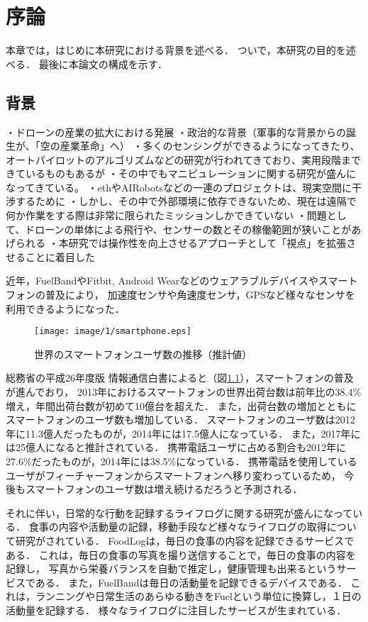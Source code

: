 \chapter{序論}
本章では，はじめに本研究における背景を述べる．
ついで，本研究の目的を述べる．
最後に本論文の構成を示す．

\section{背景}
・ドローンの産業の拡大における発展
・政治的な背景（軍事的な背景からの誕生が、「空の産業革命」へ）
・多くのセンシングができるようになってきたり、オートパイロットのアルゴリズムなどの研究が行われてきており、実用段階まできているものもあるが
・その中でもマニピュレーションに関する研究が盛んになってきている。
・ethやAIRobotsなどの一連のプロジェクトは、現実空間に干渉するために
・しかし、その中で外部環境に依存できないため、現在は遠隔で何か作業をする際は非常に限られたミッションしかできていない
・問題として、ドローンの単体による飛行や、センサーの数とその稼働範囲が狭いことがあげられる
・本研究では操作性を向上させるアプローチとして「視点」を拡張させることに着目した



近年，FuelBand\cite{FuelBand}やFitbit\cite{Fitbit}, Android Wear\cite{AndroidWear}などのウェアラブルデバイスやスマートフォンの普及により，
加速度センサや角速度センサ，GPSなど様々なセンサを利用できるようになった．
\begin{figure}[htbp]
 \begin{center}
  \texttt{[image: image/1/smartphone.eps]}
 \end{center}
 \caption{世界のスマートフォンユーザ数の推移（推計値）\cite{Smartphone}}
 \label{smartphone}
\end{figure}
総務省の平成26年度版 情報通信白書\cite{Smartphone}によると（図\ref{smartphone}），スマートフォンの普及が進んでおり，
2013年におけるスマートフォンの世界出荷台数は前年比の38.4\%増え，年間出荷台数が初めて10億台を超えた．
また，出荷台数の増加とともにスマートフォンのユーザ数も増加している．
スマートフォンのユーザ数は2012年に11.3億人だったものが，2014年には17.5億人になっている．
また，2017年には25億人になると推計されている．
携帯電話ユーザに占める割合も2012年に27.6\%だったものが，2014年には38.5\%になっている．
携帯電話を使用しているユーザがフィーチャーフォンからスマートフォンへ移り変わっているため，
今後もスマートフォンのユーザ数は増え続けるだろうと予測される．

それに伴い，日常的な行動を記録するライフログに関する研究が盛んになっている．
食事の内容や活動量の記録，移動手段など様々なライフログの取得について研究がされている．
FoodLog\cite{FoodLog}は，毎日の食事の内容を記録できるサービスである．
これは，毎日の食事の写真を撮り送信することで，毎日の食事の内容を記録し，
写真から栄養バランスを自動で推定し，健康管理も出来るというサービスである．
また，FuelBandは毎日の活動量を記録できるデバイスである．
これは，ランニングや日常生活のあらゆる動きをFuelという単位に換算し，１日の活動量を記録する．
様々なライフログに注目したサービスが生まれている．

